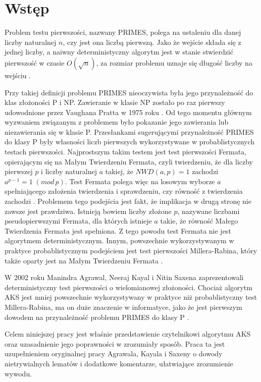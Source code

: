 \documentclass[declaration,shortabstract]{iithesis}
\author         {Martyna Siejba}
\theoremstyle{definition}
\theoremstyle{remark} \newtheorem{observation}{Obserwacja}
\theoremstyle{plain} \newtheorem{theorem}{Twierdzenie}
\theoremstyle{plain} \newtheorem{lemma}{Lemat}
\theoremstyle{remark} \newtheorem*{remark*}{Uwaga}
\theoremstyle{reminder} \newtheorem*{reminder*}{Przypomnienie}
\begin{document}

\chapter{Wstęp}

Problem testu pierwszości, nazwany PRIMES, polega na ustaleniu dla danej liczby naturalnej $n$, czy jest ona liczbą pierwszą. Jako że wejście składa się z jednej liczby, a naiwny deterministyczny algorytm jest w stanie stwierdzić pierwszość w czasie $O(\sqrt{n})$, za rozmiar problemu uznaje się długość liczby na wejściu \cite[s. 1-2]{dietz}.

Przy takiej definicji problemu PRIMES nieoczywista była jego przynależność do klas złożoności P i NP. Zawieranie w klasie NP zostało po raz pierwszy udowodnione przez Vaughana Pratta w 1975 roku \cite{pratt}. Od tego momentu głównym wyzwaniem związanym z problemem było pokazanie jego zawierania lub niezawierania się w klasie P. Przesłankami sugerującymi przynależność PRIMES do klasy P były własności liczb pierwszych wykorzystywane w probablistycznych testach pierwszości. Najprostszym takim testem jest test pierwszości Fermata, opierającym się na Małym Twierdzeniu Fermata, czyli twierdzeniu, że dla liczby pierwszej $p$ i liczby naturalnej $a$ takiej, że $NWD(a, p) = 1$ zachodzi $a^{p-1} = 1 \; (mod \, p)$. Test Fermata polega więc na losowym wyborze $a$ spełniającego założenia twierdzenia i sprawdzeniu, czy równość z twierdzenia zachodzi \cite[s. 73-76]{dietz}. Problemem tego podejścia jest fakt, że implikacja w drugą stronę nie zawsze jest prawdziwa. Istnieją bowiem liczby złożone $p$, nazywane liczbami pseudopierwszymi Fermata, dla których istnieje $a$ takie, że równość Małego Twierdzenia Fermata jest spełniona. Z tego powodu test Fermata nie jest algorytmem deterministycznym. Innym, powszechnie wykorzystywanym w praktyce probablistycznym podejściem jest test pierwszości Millera-Rabina, który także oparty jest na Małym Twierdzeniu Fermata \cite[s. 81-82]{dietz}.

W 2002 roku Manindra Agrawal, Neeraj Kayal i Nitin Saxena zaprezentowali deterministyczny test pierwszości o wielomianowej złożoności. Chociaż algorytm AKS jest mniej powszechnie wykorzystywany w praktyce niż probablistyczny test Millera-Rabina, ma on duże znaczenie w informatyce, jako że jest pierwszym dowodem na przynależność problemu PRIMES do klasy P \cite[s. 9]{dietz}.

Celem niniejszej pracy jest właśnie przedstawienie czytelnikowi algorytmu AKS oraz uzasadnienie jego poprawności w zrozumiały sposób. Praca ta jest uzupełnieniem oryginalnej pracy Agrawala, Kayala i Saxeny o dowody nietrywialnych lematów i dodatkowe komentarze, ułatwiające zrozumienie wywodu.
\end{document}
